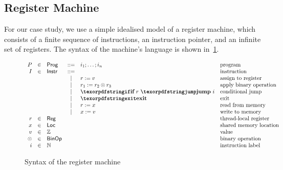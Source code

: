 \subsection{Register Machine}

For our case study, we use a simple idealised model 
of a register machine, which consists of a finite 
sequence of instructions, an instruction pointer,
and an infinite set of registers. 
The syntax of the machine's language is 
shown in~\cref{fig:regmachine-syntax}.

\begin{figure}[h!]
\[
\begin{array}{rclclll}
  P &\in& \Prog   &::=& i_1 \seq \dots \seq i_n           & \text{program}                 \\

  I &\in& \Inst     &::=&                                 & \text{instruction}             \\
              & &   & | & \assignInst{r}{v}               & \text{assign to register}      \\
              & &   & | & \opInst{\otimes}{r_1}{r_2}{r_3}  & \text{apply binary operation}  \\
              & &   & | & \jumpInst{r}{\ip{i}}            & \text{conditional jump}        \\
              & &   & | & \exitInst                       & \text{exit}                    \\
              & &   & | & \readInst{r}{x}                 & \text{read from memory}        \\
              & &   & | & \writeInst{x}{v}                & \text{write to memory}         \\

  r      &\in& \Reg     &   &                    & \text{thread-local register}   \\ 
  x      &\in& \Loc     &   &                    & \text{shared memory location}  \\ 
  v      &\in& \Z       &   &                    & \text{value}                   \\
  \otimes&\in& \BinOp   &   &                    & \text{binary operation}        \\
  \ip{i} &\in& \N       &   &                    & \text{instruction label}       \\ 

\end{array}
\] 
\caption{Syntax of the register machine}
\label{fig:regmachine-syntax}
\end{figure}

